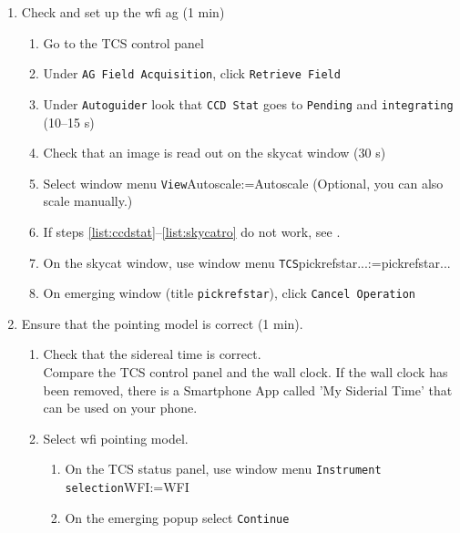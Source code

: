 \documentclass[11pt,fleqn,a4paper]{book}
\makeatletter
\def\menu#1#2{\texttt{#1}\ifx{}#2\else\@for\@x:=#2\do{$\rightarrow$\texttt{\@x}}\fi}
\def\wmenu#1#2{window menu \menu{#1}{#2}}
\makeatother
\begin{document}
\begin{enumerate}
\begin{enumerate}
\begin{enumerate}
\begin{itemize}
                \item Ignore window \texttt{CSS ALARM DISPLAY} () if it pops up on the \gls{wfi} screen.
             \end{itemize}     
                \end{enumerate}
          \item Check and set up the \gls{wfi} \gls{ag} (1 min)
          \begin{enumerate}
                \item Go to the \gls{TCS control panel}
                \item Under \texttt{AG Field Acquisition}, click \texttt{Retrieve Field}
                \item\label{list:ccdstat} Under \texttt{Autoguider} look that \texttt{CCD Stat} goes to \texttt{Pending} and \texttt{integrating} (10--15 s)
                \item\label{list:skycatro} Check that an image is read out on the \gls{skycat} window (30 s)
                \item Select \wmenu{View}{Autoscale} (Optional, you can also scale manually.)
                \item If steps \ref{list:ccdstat}--\ref{list:skycatro} do not work, see .
                \item On the \gls{skycat} window, use \wmenu{TCS}{\gls{pickrefstar}...}
                \item On emerging window (title \texttt{\gls{pickrefstar}}), click \texttt{Cancel Operation}\\
          \end{enumerate}
          \item Ensure that the \gls{pointing model} is correct (1 min).
          \begin{enumerate}
            \item Check that the sidereal time is correct.\\
                  Compare the \gls{TCS control panel} and the wall clock. If the wall clock has been removed, there is a Smartphone App called 'My Siderial Time' that can be used on your phone.
            \item\label{list:pmcheck:wfi} Select \gls{wfi} \gls{pointing model}.
               \begin{enumerate}
                  \item On the \gls{TCS status panel}, use \wmenu{Instrument selection}{WFI}
                  \item On the emerging popup select \texttt{Continue}

\end{enumerate}
\end{enumerate}
\end{enumerate}
\end{enumerate}
\end{document}
